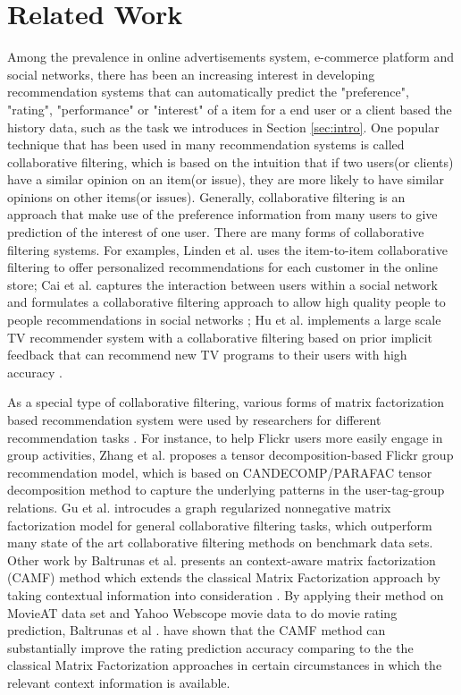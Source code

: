 \section{Related Work}
\label{sec:related}

Among the prevalence in online advertisements system, e-commerce
platform and social networks, there has been an increasing interest in
developing recommendation systems \cite{resnick1997recommender,
  ricci2011recommender} that can automatically predict the
"preference", "rating", "performance" or "interest" of a item for a
end user or a client based the history data, such as the task we
introduces in Section \ref{sec:intro}. One popular technique that has
been used in many recommendation systems is called collaborative
filtering, which is based on the intuition that if two users(or
clients) have a similar opinion on an item(or issue), they are more
likely to have similar opinions on other items(or
issues)\cite{resnick1997recommender, sarwar2001item,
  koren2011advances, ricci2011recommender}. Generally, collaborative
filtering is an approach that make use of the preference information
from many users to give prediction of the interest of one user. There
are many forms of collaborative filtering systems. For examples,
Linden et al. uses the item-to-item collaborative filtering to offer
personalized recommendations for each customer in the online
store\cite{linden2003amazon}; Cai et al. captures the interaction
between users within a social network and formulates a collaborative
filtering approach to allow high quality people to people
recommendations in social networks \cite{cai2011collaborative}; Hu et
al. implements a large scale TV recommender system with a
collaborative filtering based on prior implicit feedback that can
recommend new TV programs to their users with high accuracy
\cite{hu:2008}.

As a special type of collaborative filtering, various forms of matrix
factorization based recommendation system were used by researchers for
different recommendation tasks \cite{ZitnikZ12, lin2007projected,
  lee2001algorithms, brunet2004metagenes, parambath2013matrix,
  ricci2011recommender}. For instance, to help Flickr users more
easily engage in group activities, Zhang et al. proposes a tensor
decomposition-based Flickr group recommendation model, which is based
on CANDECOMP/PARAFAC tensor decomposition method to capture the
underlying patterns in the user-tag-group
relations\cite{zheng2010flickr}. Gu et al. introcudes a graph
regularized nonnegative matrix factorization model for general
collaborative filtering tasks, which outperform many state of the art
collaborative filtering methods on benchmark data
sets\cite{gu2010collaborative}. Other work by Baltrunas et
al. presents an context-aware matrix factorization (CAMF) method which
extends the classical Matrix Factorization approach by taking
contextual information into consideration
\cite{baltrunas2011matrix}. By applying their method on MovieAT data
set and Yahoo Webscope movie data to do movie rating prediction,
Baltrunas et al . have shown that the CAMF method can substantially
improve the rating prediction accuracy comparing to the the classical
Matrix Factorization approaches in certain circumstances in which the
relevant context information is available.

